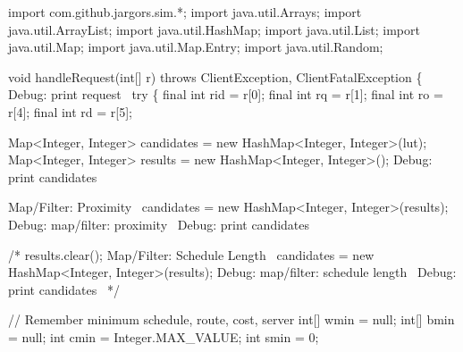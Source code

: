 \nwenddocs{}\endmoddef\nwstartdeflinemarkup{}\nwenddeflinemarkup
import com.github.jargors.sim.*;
import java.util.Arrays;
import java.util.ArrayList;
import java.util.HashMap;
import java.util.List;
import java.util.Map;
import java.util.Map.Entry;
import java.util.Random;
\nwendcode{}\nwdocspar

\nwenddocs{}\endmoddef\nwstartdeflinemarkup{}\nwenddeflinemarkup
void handleRequest(int[] r) throws ClientException, ClientFatalException \{
  \LA{}Debug: print request~{\nwtagstyle{}}\RA{}
  try \{
    final int rid = r[0];
    final int rq  = r[1];
    final int ro  = r[4];
    final int rd  = r[5];

    Map<Integer, Integer> candidates = new HashMap<Integer, Integer>(lut);
    Map<Integer, Integer> results = new HashMap<Integer, Integer>();
    \LA{}Debug: print candidates~{\nwtagstyle{}}\RA{}

    \LA{}Map/Filter: Proximity~{\nwtagstyle{}}\RA{}
    candidates = new HashMap<Integer, Integer>(results);
    \LA{}Debug: map/filter: proximity~{\nwtagstyle{}}\RA{}
    \LA{}Debug: print candidates~{\nwtagstyle{}}\RA{}

    /*
    results.clear();
    \LA{}Map/Filter: Schedule Length~{\nwtagstyle{}}\RA{}
    candidates = new HashMap<Integer, Integer>(results);
    \LA{}Debug: map/filter: schedule length~{\nwtagstyle{}}\RA{}
    \LA{}Debug: print candidates~{\nwtagstyle{}}\RA{}
    */

    // Remember minimum schedule, route, cost, server
    int[] wmin = null;
    int[] bmin = null;
    int cmin = Integer.MAX_VALUE;
    int smin = 0;

